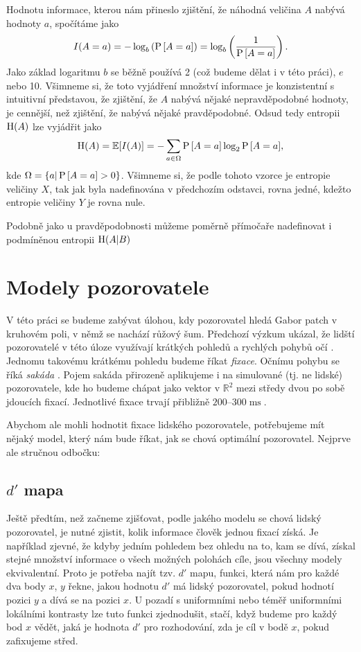 Hodnotu informace, kterou nám přineslo zjištění, že náhodná veličina $A$ nabývá
hodnoty $a$, spočítáme jako $$I(A=a)=-\log_b\left({\P{A=a}}\right)=\log_b\left(\frac1{\P{A=a}}\right).$$ Jako
základ logaritmu $b$ se běžně používá 2 (což budeme dělat i v této práci), $e$
nebo 10. Všimneme si, že toto vyjádření množství informace je konzistentní s
intuitivní představou, že zjištění, že $A$ nabývá nějaké nepravděpodobné
hodnoty, je cennější, než zjištění, že nabývá nějaké pravděpodobné. Odsud tedy
entropii $\H(A)$ lze vyjádřit jako $$\H(A)=\mathbb{E}[I(A)]=-\displaystyle\sum_{a
\in \Omega}\P{A=a}\log_2{\P{A=a}},$$ kde $\Omega = \{a|\P{A=a} > 0\}$.
Všimneme si, že podle tohoto vzorce je entropie veličiny $X$, tak jak byla
nadefinována v předchozím odstavci, rovna jedné, kdežto  entropie veličiny $Y$
je rovna nule.

Podobně jako u pravděpodobnosti můžeme poměrně přímočaře nadefinovat i   
podmíněnou entropii $\H(A| B)$

\section{Modely pozorovatele}


V této práci se budeme zabývat úlohou, kdy pozorovatel hledá Gabor patch v
kruhovém poli, v němž se nachází růžový šum. Předchozí výzkum ukázal, že lidští
pozorovatelé v této úloze využívají krátkých pohledů a rychlých pohybů očí \citep{Najemnik05}.
Jednomu takovému krátkému pohledu budeme říkat \emph{fixace}. Očnímu pohybu
se říká \emph{sakáda} \citep{sakady}. Pojem sakáda přirozeně aplikujeme i na simulované
(tj. ne lidské) pozorovatele, kde ho budeme chápat jako vektor v $\mathbb{R}^2$
mezi středy dvou po sobě jdoucích fixací. Jednotlivé fixace trvají přibližně
$200$--$300 \operatorname{ms}$.

Abychom ale mohli hodnotit fixace lidského pozorovatele, potřebujeme mít nějaký
model, který nám bude říkat, jak se chová optimální pozorovatel. Nejprve ale
stručnou odbočku:

\subsection{$d'$ mapa}

Ještě předtím, než začneme zjišťovat, podle jakého modelu se chová lidský
pozorovatel, je nutné zjistit, kolik informace člověk jednou fixací získá. Je
například zjevné, že kdyby jedním pohledem bez ohledu na to, kam se dívá,
získal stejné množství informace o všech možných polohách cíle, jsou všechny
modely ekvivalentní. Proto je potřeba najít tzv. $d'$ mapu, funkci, která nám
pro každé dva body $x$, $y$ řekne, jakou hodnotu $d'$ má lidský pozorovatel,
pokud hodnotí pozici $y$ a dívá se na pozici $x$. U pozadí s uniformními nebo
téměř uniformními lokálními kontrasty lze tuto funkci zjednodušit, stačí, když
budeme pro každý bod $x$ vědět, jaká je hodnota $d'$ pro rozhodování, zda je
cíl v bodě $x$, pokud zafixujeme střed.


